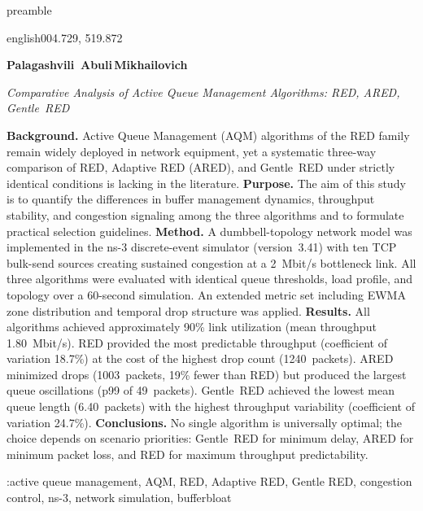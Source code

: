  {preamble}\fancyhead {}\fancyfoot {}
\par \noindent \textbf {}\par \begin {otherlanguage*}{english}\PFUudcName {}004.729, 519.872\par \makeatletter \textbf {Palagashvili \,Abuli\unhbox \voidb@x \nobreak \,Mikhailovich}\makeatother \par \textit {Comparative Analysis of Active Queue Management Algorithms: RED, ARED, Gentle~RED}\par \textbf {Background.} Active Queue Management (AQM) algorithms of the RED family remain widely deployed in network equipment, yet a systematic three-way comparison of RED, Adaptive RED (ARED), and Gentle~RED under strictly identical conditions is lacking in the literature. \textbf {Purpose.} The aim of this study is to quantify the differences in buffer management dynamics, throughput stability, and congestion signaling among the three algorithms and to formulate practical selection guidelines. \textbf {Method.} A dumbbell-topology network model was implemented in the ns-3 discrete-event simulator (version~3.41) with ten TCP bulk-send sources creating sustained congestion at a 2~Mbit/s bottleneck link. All three algorithms were evaluated with identical queue thresholds, load profile, and topology over a 60-second simulation. An extended metric set including EWMA zone distribution and temporal drop structure was applied. \textbf {Results.} All algorithms achieved approximately 90\% link utilization (mean throughput 1.80~Mbit/s). RED provided the most predictable throughput (coefficient of variation 18.7\%) at the cost of the highest drop count (1240~packets). ARED minimized drops (1003~packets, 19\% fewer than RED) but produced the largest queue oscillations (p99 of 49~packets). Gentle~RED achieved the lowest mean queue length (6.40~packets) with the highest throughput variability (coefficient of variation 24.7\%). \textbf {Conclusions.} No single algorithm is universally optimal; the choice depends on scenario priorities: Gentle~RED for minimum delay, ARED for minimum packet loss, and RED for maximum throughput predictability. \par \keywordsname :active queue management, AQM, RED, Adaptive RED, Gentle RED, congestion control, ns-3, network simulation, bufferbloat\end {otherlanguage*}\par \par \medskip 
